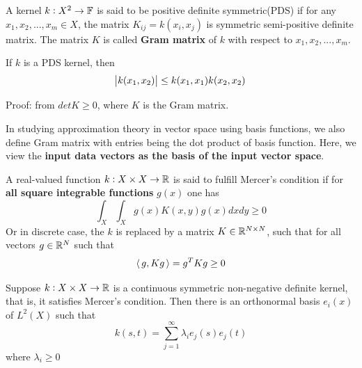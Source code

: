 \begin{refsection}
\begin{definition}
	\cite[92]{mohri2012foundations}\cite[30]{scholkopf2002learning}A kernel $k:X^2\to \mathbb{F}$ is said to be positive definite symmetric(PDS) if for any $x_1,x_2,...,x_m \in X$, the matrix $K_{ij} = k(x_i,x_j)$ is symmetric semi-positive definite matrix. The matrix $K$ is called \textbf{Gram matrix} of $k$ with respect to $x_1,x_2,...,x_m$.
\end{definition}

\begin{lemma}
	If $k$ is a PDS kernel, then
	$$\abs{k(x_1,x_2)} \leq k(x_1,x_1)k(x_2,x_2)$$
\end{lemma}
Proof: from $det K \geq 0$, where $K$ is the Gram matrix.


\begin{remark}[interpretation]
	In studying approximation theory in vector space using basis functions, we also define Gram matrix with entries being the dot product of basis function. Here, we view the \textbf{input data vectors as the basis of the input vector space}.
\end{remark}


\begin{definition}
	A real-valued function $k:X\times X \to \mathbb{R}$ is said to fulfill Mercer's condition if for \textbf{all square integrable functions} $g(x)$ one has
	$$\int_X\int_X g(x)K(x,y)g(x) dxdy \geq 0$$
	Or in discrete case, the $k$ is replaced by a matrix $K\in \mathbb{R}^{N\times N}$, such that for all vectors $g\in \mathbb{R}^N$ such that
	$${\left< \, g,Kg \, \right>} = g^T K g \geq 0$$
\end{definition}


\begin{theorem}
	\cite{wiki:Mercer}\cite[64]{shawe2004kernel}
	Suppose $k:X\times X\to \mathbb{R}$ is a continuous symmetric non-negative definite kernel, that is, it satisfies Mercer's condition. Then there is an orthonormal basis $e_i(x)$ of $L^2(X)$ such that
	$$k(s,t) = \sum_{j=1}^\infty \lambda_i e_j(s)e_j(t)$$
	where $\lambda_i \geq 0$
\end{theorem}


\end{refsection}
